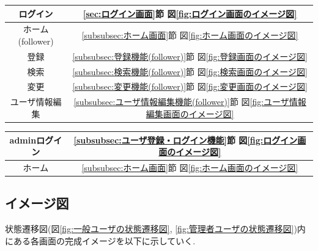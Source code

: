 \documentclass[11ptm]{jsarticle}
\begin{document}
\begin{minipage}[t]{0.5\linewidth}
  \vspace{1zh}
  \begin{center}
    \begin{tabular}{c|c}
      ログイン         & \ref{sec:ログイン画面}節 図\ref{fig:ログイン画面のイメージ図}                             \\
      \hline
      ホーム(follower) & \ref{subsubsec:ホーム画面}節 図\ref{fig:ホーム画面のイメージ図}                           \\
      \hline
      登録             & \ref{subsubsec:登録機能(follower)}節 図\ref{fig:登録画面のイメージ図}                     \\
      \hline
      検索             & \ref{subsubsec:検索機能(follower)}節 図\ref{fig:検索画面のイメージ図}                     \\
      \hline
      変更             & \ref{subsubsec:変更機能(follower)}節 図\ref{fig:変更画面のイメージ図}                     \\
      \hline
      ユーザ情報編集   & \ref{subsubsec:ユーザ情報編集機能(follower)}節 図\ref{fig:ユーザ情報編集画面のイメージ図} \\
    \end{tabular}
  \end{center}
\end{minipage}
%
\hfill
%
\begin{minipage}[t]{0.5\linewidth}
  \vspace{1zh}
  \begin{center}
    \begin{tabular}{c|c}
      adminログイン & \ref{subsubsec:ユーザ登録・ログイン機能}節 図\ref{fig:ログイン画面のイメージ図} \\
      \hline
      ホーム        & \ref{subsubsec:ホーム画面}節 図\ref{fig:ホーム画面のイメージ図}                 \\
    \end{tabular}
  \end{center}
\end{minipage}

\clearpage
\subsection{イメージ図}
\label{sec:イメージ図}
状態遷移図(図\ref{fig:一般ユーザの状態遷移図}, \ref{fig:管理者ユーザの状態遷移図})内にある各画面の完成イメージを以下に示していく.
\end{document}
